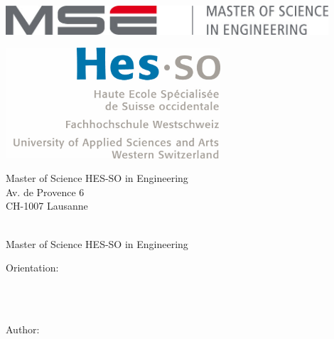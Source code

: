 \begin{titlepage}
{\selectfont
	\begin{flushright}
		\begin{minipage}{0.5\textwidth}
			\begin{flushleft}
				\includegraphics[width=0.9\textwidth]{99-imgs/logo_mse}
			\end{flushleft}
		\end{minipage}%
		\begin{minipage}{0.5\textwidth}
			\begin{flushright}
				\includegraphics[width=0.6\textwidth]{99-imgs/logo_hesso}
			\end{flushright}
		\end{minipage}
		\begin{flushleft}\scriptsize
		Master of Science HES-SO in Engineering \\
		Av. de Provence 6 \\
		CH-1007 Lausanne
		\end{flushleft}
		
		~\\[0.5cm]
		
		{\Huge Master of Science HES-SO in Engineering\\[0.5cm]}
		
		{\LARGE Orientation: \Orientation\\[0.5cm] ~\\[1cm]}
		
		{\Huge \ThesisTitle \\[1.5cm]}
		
		{
		\large Author:\\
		\Huge \Author \\ %
		\large \texttt{\AuthorEmail} \\[1cm]
		}
		

\end{flushright}}
\end{titlepage}
